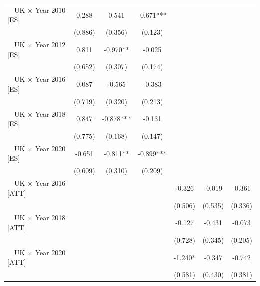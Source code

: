 \begin{table}[!htbp]
\begin{threeparttable}
\begin{tabular}{l*{6}{c}}
\midrule
~~UK $\times$ Year 2010 [ES]&       0.288   &       0.541   &      -0.671***&               &               &               \\
                    &     (0.886)   &     (0.356)   &     (0.123)   &               &               &               \\
~~UK $\times$ Year 2012 [ES]&       0.811   &      -0.970** &      -0.025   &               &               &               \\
                    &     (0.652)   &     (0.307)   &     (0.174)   &               &               &               \\
~~UK $\times$ Year 2016 [ES]&       0.087   &      -0.565   &      -0.383   &               &               &               \\
                    &     (0.719)   &     (0.320)   &     (0.213)   &               &               &               \\
~~UK $\times$ Year 2018 [ES]&       0.847   &      -0.878***&      -0.131   &               &               &               \\
                    &     (0.775)   &     (0.168)   &     (0.147)   &               &               &               \\
~~UK $\times$ Year 2020 [ES]&      -0.651   &      -0.811** &      -0.899***&               &               &               \\
                    &     (0.609)   &     (0.310)   &     (0.209)   &               &               &               \\
~~UK $\times$ Year 2016 [ATT]&               &               &               &      -0.326   &      -0.019   &      -0.361   \\
                    &               &               &               &     (0.506)   &     (0.535)   &     (0.336)   \\
~~UK $\times$ Year 2018 [ATT]&               &               &               &      -0.127   &      -0.431   &      -0.073   \\
                    &               &               &               &     (0.728)   &     (0.345)   &     (0.205)   \\
~~UK $\times$ Year 2020 [ATT]&               &               &               &      -1.240*  &      -0.347   &      -0.742   \\
                    &               &               &               &     (0.581)   &     (0.430)   &     (0.381)   \\

\end{tabular}
\end{threeparttable}
\end{table}
